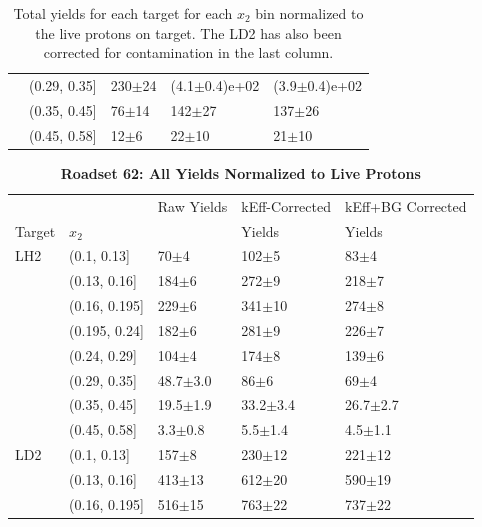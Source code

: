 \begin{table}
\begin{tabular}{lllll}
	& (0.29, 0.35] &           230$\pm$24 &    (4.1$\pm$0.4)e+02 &    (3.9$\pm$0.4)e+02 \\
	& (0.35, 0.45] &            76$\pm$14 &           142$\pm$27 &           137$\pm$26 \\
	& (0.45, 0.58] &             12$\pm$6 &            22$\pm$10 &            21$\pm$10 \\
	\bottomrule
\end{tabular}
	\caption{Total yields for each target for each $x_2$ bin normalized to the live protons on target. The LD2 has also been corrected for contamination in the last column.}
	\label{tab:final-yields-57}
\end{table}

\begin{table}
	\centering
	\caption*{\textbf{Roadset 62: All Yields Normalized to Live Protons}}
\begin{tabular}{lllll}
	\toprule
	&             &      Raw Yields &  kEff-Corrected &   kEff+BG Corrected \\
	Target & $x_2$ &                    &            Yields        &                Yields    \\
	\midrule
	LH2 & (0.1, 0.13] &             70$\pm$4 &            102$\pm$5 &             83$\pm$4 \\
	& (0.13, 0.16] &            184$\pm$6 &            272$\pm$9 &            218$\pm$7 \\
	& (0.16, 0.195] &            229$\pm$6 &           341$\pm$10 &            274$\pm$8 \\
	& (0.195, 0.24] &            182$\pm$6 &            281$\pm$9 &            226$\pm$7 \\
	& (0.24, 0.29] &            104$\pm$4 &            174$\pm$8 &            139$\pm$6 \\
	& (0.29, 0.35] &         48.7$\pm$3.0 &             86$\pm$6 &             69$\pm$4 \\
	& (0.35, 0.45] &         19.5$\pm$1.9 &         33.2$\pm$3.4 &         26.7$\pm$2.7 \\
	& (0.45, 0.58] &          3.3$\pm$0.8 &          5.5$\pm$1.4 &          4.5$\pm$1.1 \\
\rowcol 	LD2 & (0.1, 0.13] &            157$\pm$8 &           230$\pm$12 &           221$\pm$12 \\
\rowcol 	& (0.13, 0.16] &           413$\pm$13 &           612$\pm$20 &           590$\pm$19 \\
\rowcol 	& (0.16, 0.195] &           516$\pm$15 &           763$\pm$22 &           737$\pm$22 \\

\end{tabular}
\end{table}
